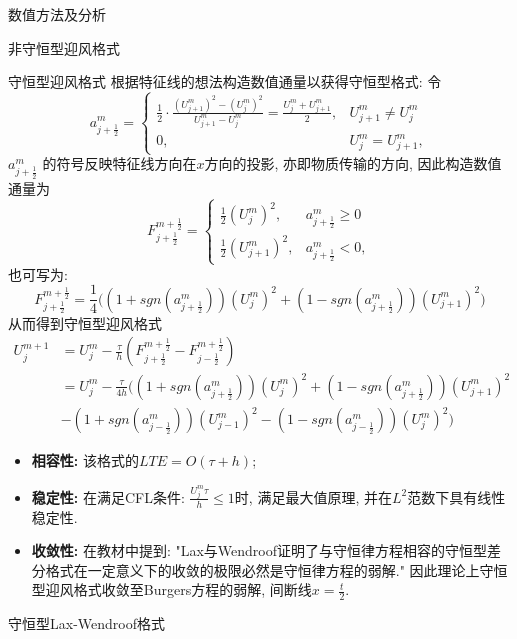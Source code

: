 \documentclass{article}
\begin{document}
\begin{section}{数值方法及分析}
\begin{subsection}{非守恒型迎风格式}
    \end{subsection}
    \begin{subsection}{守恒型迎风格式}
        根据特征线的想法构造数值通量以获得守恒型格式: 令
        $$a_{j+\frac{1}{2}}^m = \left\{\begin{array}{ll}
            \frac{1}{2}\cdot\frac{(U_{j+1}^m)^2-(U_j^m)^2}{U_{j+1}^m-U_j^m} = \frac{U_j^m+U_{j+1}^m}{2} ,& U_{j+1}^m\neq U_j^m \\
            0,&U_j^m = U_{j+1}^m,
        \end{array}\right.$$
        $a_{j+\frac{1}{2}}^m$ 的符号反映特征线方向在$x$方向的投影, 亦即物质传输的方向, 因此构造数值通量为
        $$F_{j+\frac{1}{2}}^{m+\frac{1}{2}} = \left\{\begin{array}{ll}
            \frac{1}{2}(U_j^m)^2 ,& a_{j+\frac{1}{2}}^m \geq 0 \\
            \frac{1}{2}(U_{j+1}^m)^2,& a_{j+\frac{1}{2}}^m < 0,
        \end{array}\right.$$
        也可写为:
        $$F_{j+\frac{1}{2}}^{m+\frac{1}{2}} = \frac{1}{4}\bigg((1+sgn(a_{j+\frac{1}{2}}^m))(U_j^m)^2 + (1-sgn(a_{j+\frac{1}{2}}^m))(U_{j+1}^m)^2 \bigg)$$
        从而得到守恒型迎风格式
        \begin{align*}
            U_j^{m+1} &= U_j^m - \frac{\tau}{h}(F_{j+\frac{1}{2}}^{m+\frac{1}{2}}-F_{j-\frac{1}{2}}^{m+\frac{1}{2}}) \\
                    &=U_j^m -\frac{\tau}{4h}\bigg((1+sgn(a_{j+\frac{1}{2}}^m))(U_j^m)^2 + (1-sgn(a_{j+\frac{1}{2}}^m))(U_{j+1}^m)^2  \\
                    & - (1+sgn(a_{j-\frac{1}{2}}^m))(U_{j-1}^m)^2 - (1-sgn(a_{j-\frac{1}{2}}^m))(U_{j}^m)^2\bigg)
        \end{align*}
        \begin{itemize}
            \item \textbf{相容性: }该格式的$LTE = O(\tau+h)$;
            \item \textbf{稳定性: }在满足CFL条件: $\frac{U_j^m\tau}{h}\leq 1$时, 满足最大值原理, 并在$L^2$范数下具有线性稳定性.
            \item \textbf{收敛性: }在教材中提到: "Lax与Wendroof证明了与守恒律方程相容的守恒型差分格式在一定意义下的收敛的极限必然是守恒律方程的弱解." 因此理论上守恒型迎风格式收敛至Burgers方程的弱解, 间断线$x=\frac{t}{2}$.
        \end{itemize}
    \end{subsection}
    \begin{subsection}{守恒型Lax-Wendroof格式}

\end{subsection}
\end{section}
\end{document}
